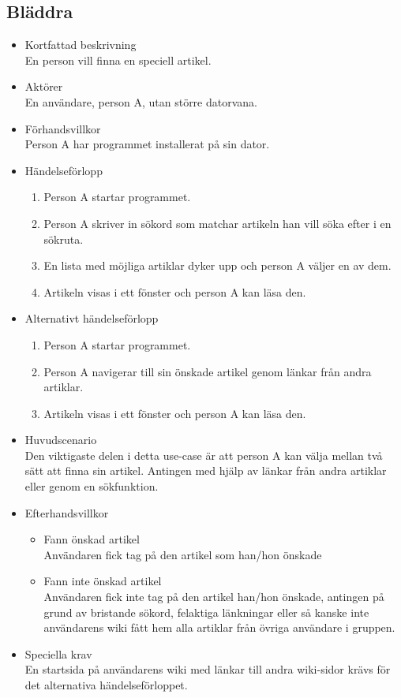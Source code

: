 \subsection{Bläddra}

\begin{itemize}
	\item Kortfattad beskrivning
	\\En person vill finna en speciell artikel.
	\item Aktörer
	\\En användare, person A, utan större datorvana.
	\item Förhandsvillkor
	\\Person A har programmet installerat på sin dator.
	\item Händelseförlopp
	\begin{enumerate}
		\item Person A startar programmet.
		\item Person A skriver in sökord som matchar artikeln han vill söka efter i en sökruta.
		\item En lista med möjliga artiklar dyker upp och person A väljer en av dem.
		\item Artikeln visas i ett fönster och person A kan läsa den.
	\end{enumerate}
	\item Alternativt händelseförlopp
	\begin{enumerate}
		\item Person A startar programmet.
		\item Person A navigerar till sin önskade artikel genom länkar från andra artiklar.	
		\item Artikeln visas i ett fönster och person A kan läsa den.
	\end{enumerate}	
	\item Huvudscenario
	\\Den viktigaste delen i detta use-case är att person A kan välja mellan två sätt att finna sin artikel. Antingen med hjälp av länkar från andra artiklar eller genom en sökfunktion.
	\item Efterhandsvillkor
	\begin{itemize}
	\item Fann önskad artikel
	\\Användaren fick tag på den artikel som han/hon önskade
	\item Fann inte önskad artikel
	\\Användaren fick inte tag på den artikel han/hon önskade, antingen på grund av bristande sökord, felaktiga länkningar eller så kanske inte användarens wiki fått hem alla artiklar från övriga användare i gruppen.
	\end{itemize}
	\item Speciella krav
	\\En startsida på användarens wiki med länkar till andra wiki-sidor krävs för det alternativa händelseförloppet.
\end{itemize}

